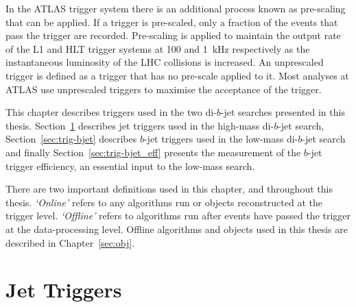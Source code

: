 
In the ATLAS trigger system there is an additional process known as pre-scaling that can be applied.
If a trigger is pre-scaled, only a fraction of the events that pass the trigger are recorded.
Pre-scaling is applied to maintain the output rate of the L1 and HLT trigger systems at 100 and 1~kHz respectively as the instantaneous luminosity of the LHC collisions is increased.
An unprescaled trigger is defined as a trigger that has no pre-scale applied to it.
Most analyses at ATLAS use unprescaled triggers to maximise the acceptance of the trigger.

This chapter describes triggers used in the two di-$b$-jet searches presented in this thesis.
Section~\ref{sec:trig-jet} describes jet triggers used in the high-mass di-$b$-jet search,
Section~\ref{sec:trig-bjet} describes $b$-jet triggers  used in the low-mass di-$b$-jet search
and finally Section~\ref{sec:trig-bjet_eff} presents the measurement of the $b$-jet trigger efficiency, an essential input to the low-mass search.

There are two important definitions used in this chapter, and throughout this thesis.
\textit{`Online'} refers to any algorithms run or objects reconstructed at the trigger level.
\textit{`Offline'} refers to algorithms run after events have passed the trigger at the data-processing level.
Offline algorithms and objects used in this thesis are described in Chapter~\ref{sec:obj}.

\section{Jet Triggers}
\label{sec:trig-jet}

